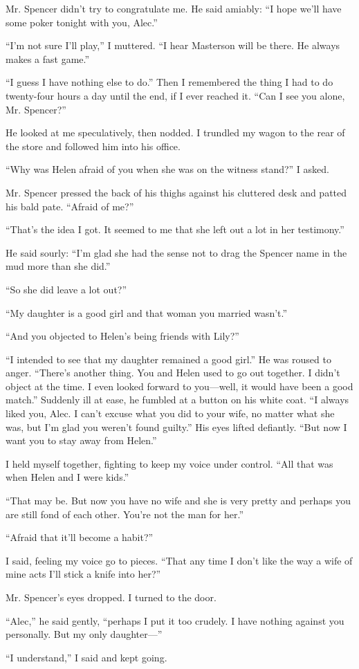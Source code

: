 {Mr. Spencer didn’t try to congratulate me. He said amiably: “I hope we’ll have some poker tonight with you, Alec.”

“I’m not sure I’ll play,” I muttered. “I hear Masterson will be there. He always makes a fast game.”

“I guess I have nothing else to do.” Then I remembered the thing I had to do twenty-four hours a day until the end, if I ever reached it. “Can I see you alone, Mr. Spencer?”

He looked at me speculatively, then nodded. I trundled my wagon to the rear of the store and followed him into his office.

“Why was Helen afraid of you when she was on the witness stand?” I asked.

Mr. Spencer pressed the back of his thighs against his cluttered desk and patted his bald pate. “Afraid of me?”

“That’s the idea I got. It seemed to me that she left out a lot in her testimony.”

He said sourly: “I’m glad she had the sense not to drag the Spencer name in the mud more than she did.”

“So she did leave a lot out?”

“My daughter is a good girl and that woman you married wasn’t.”

“And you objected to Helen’s being friends with Lily?”

“I intended to see that my daughter remained a good girl.” He was roused to anger. “There’s another thing. You and Helen used to go out together. I didn’t object at the time. I even looked forward to you—well, it would have been a good match.” Suddenly ill at ease, he fumbled at a button on his white coat. “I always liked you, Alec. I can’t excuse what you did to your wife, no matter what she was, but I’m glad you weren’t found guilty.” His eyes lifted defiantly. “But now I want you to stay away from Helen.”

I held myself together, fighting to keep my voice under control. “All that was when Helen and I were kids.”

“That may be. But now you have no wife and she is very pretty and perhaps you are still fond of each other. You’re not the man for her.”

“Afraid that it’ll become a habit?”

I said, feeling my voice go to pieces. “That any time I don’t like the way a wife of mine acts I’ll stick a knife into her?”

Mr. Spencer’s eyes dropped. I turned to the door.

“Alec,” he said gently, “perhaps I put it too crudely. I have nothing against you personally. But my only daughter—”

“I understand,” I said and kept going.

}

